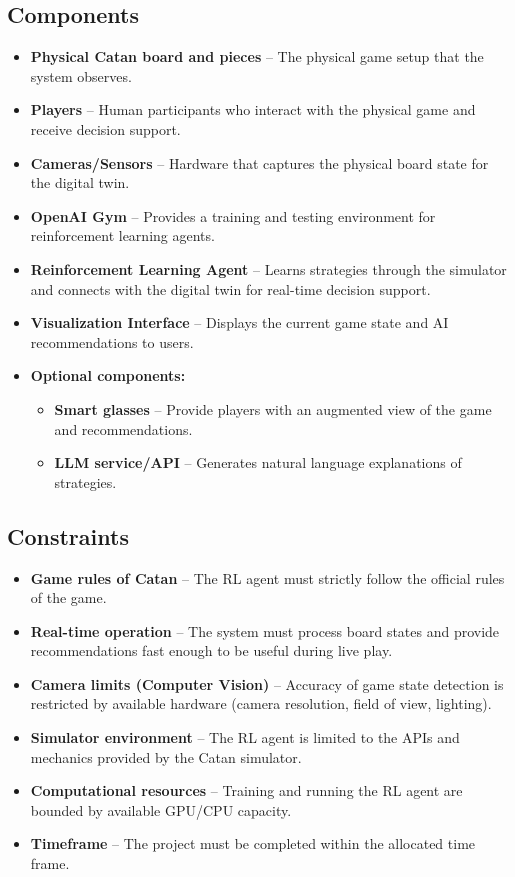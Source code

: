 \documentclass{article}
\begin{document}
\subsection{Components}\label{subsec:components2}
\begin{itemize}
    \item \textbf{Physical Catan board and pieces} – The physical game setup that the system observes.
    \item \textbf{Players} – Human participants who interact with the physical game and receive decision support.
    \item \textbf{Cameras/Sensors} – Hardware that captures the physical board state for the digital twin.
    \item \textbf{OpenAI Gym} – Provides a training and testing environment for reinforcement learning agents.
    \item \textbf{Reinforcement Learning Agent} – Learns strategies through the simulator and connects with the digital twin for real-time decision support.
    \item \textbf{Visualization Interface} – Displays the current game state and AI recommendations to users.
    \item \textbf{Optional components:}
    \begin{itemize}
        \item \textbf{Smart glasses} – Provide players with an augmented view of the game and recommendations.
        \item \textbf{LLM service/API} – Generates natural language explanations of strategies.
    \end{itemize}
\end{itemize}

\subsection{Constraints}\label{subsec:constraints}
\begin{itemize}
    \item \textbf{Game rules of Catan} – The RL agent must strictly follow the official rules of the game.
    \item \textbf{Real-time operation} – The system must process board states and provide recommendations fast enough to be useful during live play.
    \item \textbf{Camera limits (Computer Vision)} – Accuracy of game state detection is restricted by available hardware (camera resolution, field of view, lighting).
    \item \textbf{Simulator environment} – The RL agent is limited to the APIs and mechanics provided by the Catan simulator.
    \item \textbf{Computational resources} – Training and running the RL agent are bounded by available GPU/CPU capacity.
    \item \textbf{Timeframe} – The project must be completed within the allocated time frame.
\end{itemize}
\end{document}
